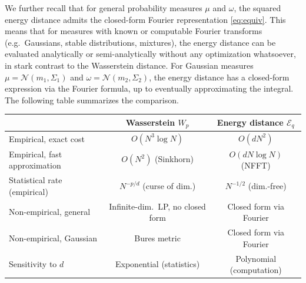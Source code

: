 \documentclass[12pt,a4paper,oneside]{amsart}
\theoremstyle{plain}
\theoremstyle{definition}
\numberwithin{equation}{section}
\numberwithin{figure}{section}
\numberwithin{table}{section}
\theoremstyle{remark}
\newcommand{\R}{\mathbb{R}}
\begin{document}
We further recall that for general probability measures $\mu$ and $\omega$, the squared energy distance
admits the closed-form Fourier representation \eqref{eq:equiv}.
This means that for measures with known or computable Fourier
transforms (e.g.\ Gaussians, stable distributions, mixtures), the energy distance
can be evaluated analytically or semi-analytically without any optimization
whatsoever, in stark contrast to the Wasserstein distance. For Gaussian measures
$\mu = \mathcal{N}(m_1, \Sigma_1)$ and $\omega = \mathcal{N}(m_2, \Sigma_2)$, the
energy distance has a closed-form expression via the Fourier formula, up to eventually approximating the integral.
\\
 
The following table summarizes the comparison.
{ \footnotesize
\medskip
\begin{center}
\begin{tabular}{lcc}
\toprule
 & Wasserstein $W_p$ & Energy distance $\mathcal E_q$ \\
\midrule
Empirical, exact cost          & $O(N^3 \log N)$       & $O(dN^2)$               \\
Empirical, fast approximation  & $O(N^2)$ (Sinkhorn)   & $O(dN\log N)$ (NFFT)    \\
Statistical rate (empirical)   & $N^{-p/d}$ (curse of dim.) & $N^{-1/2}$ (dim.-free) \\
Non-empirical, general         & Infinite-dim.\ LP, no closed form
                                                        & Closed form via Fourier \\
Non-empirical, Gaussian        & Bures metric 
                                                        & Closed form via Fourier \\
Sensitivity to $d$             & Exponential (statistics) & Polynomial (computation) \\
\bottomrule
\end{tabular}
\end{center}
}
\medskip
\end{document}
